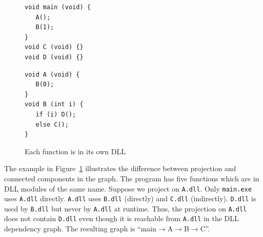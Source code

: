 \begin{figure}
\centering
\begin{minipage}[t]{3.5cm}
\begin{verbatim}
void main (void) {
   A();
   B(1);
}
void C (void) {}
void D (void) {}
\end{verbatim}
\end{minipage}
\hspace{2.0cm}
\begin{minipage}[t]{3.0cm}
\begin{verbatim}
void A (void) {
   B(0);
}
void B (int i) {
   if (i) D();
   else C();
}
\end{verbatim}
\end{minipage}
\caption{Each function is in its own DLL}
\label{fig:indcalls}
\end{figure}

The example in Figure~\ref{fig:indcalls} illustrates the difference between
projection and connected components in the graph.
The program has
five functions which are in DLL modules of the same name.
Suppose we project on {\tt A.dll}.
Only {\tt main.exe} uses {\tt A.dll} directly.
{\tt A.dll} uses {\tt B.dll} (directly) and
{\tt C.dll} (indirectly).
{\tt D.dll} is used by {\tt B.dll} but never by {\tt A.dll} at runtime.
Thus, the projection on {\tt A.dll} does not contain {\tt D.dll} even though
it is reachable from {\tt A.dll} in the DLL dependency graph.
The resulting graph is ``main$\rightarrow$A$\rightarrow$B$\rightarrow$C''.
